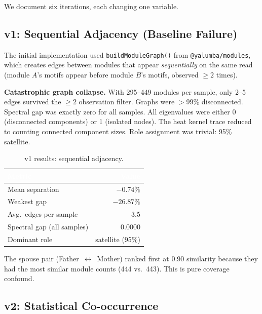 \documentclass{../yalumba}
\begin{document}
We document six iterations, each changing one variable.

\subsection{v1: Sequential Adjacency (Baseline Failure)}

The initial implementation used \texttt{buildModuleGraph()} from
\texttt{@yalumba/modules}, which creates edges between modules that appear
\emph{sequentially} on the same read (module $A$'s motifs appear before module
$B$'s motifs, observed $\geq 2$ times).

\begin{limitation}
\textbf{Catastrophic graph collapse.}  With 295--449 modules per sample, only
2--5 edges survived the $\geq 2$ observation filter.  Graphs were $>$99\%
disconnected.  Spectral gap was exactly zero for all samples.  All eigenvalues
were either 0 (disconnected components) or 1 (isolated nodes).  The heat kernel
trace reduced to counting connected component sizes.  Role assignment was
trivial: 95\% satellite.
\end{limitation}

\begin{table}[H]
  \centering
  \tablestyle
  \caption{v1 results: sequential adjacency.}
  \label{tab:v1}
  \begin{tabular}{lr}
    \toprule
    \rowcolor{table-header}
    \textcolor{white}{\textbf{Metric}} &
    \textcolor{white}{\textbf{Value}} \\
    \midrule
    Mean separation & $-0.74\%$ \\
    Weakest gap & $-26.87\%$ \\
    Avg.\ edges per sample & 3.5 \\
    Spectral gap (all samples) & 0.0000 \\
    Dominant role & satellite (95\%) \\
    \bottomrule
  \end{tabular}
\end{table}

The spouse pair (Father~$\leftrightarrow$~Mother) ranked first at 0.90
similarity because they had the most similar module counts (444 vs.\ 443).
This is pure coverage confound.

\subsection{v2: Statistical Co-occurrence}
\end{document}
